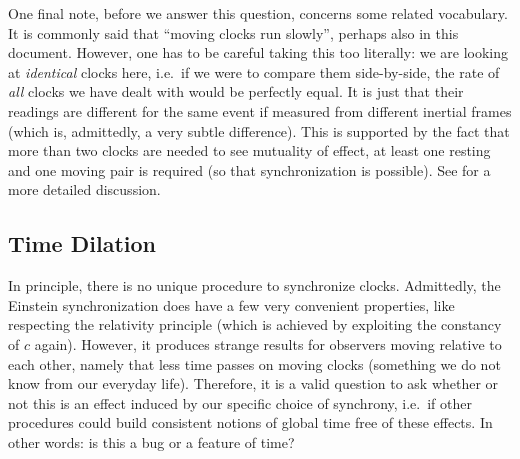 \documentclass[../relativity_main.tex]{subfiles}
\begin{document}
One final note, before we answer this question, concerns some related vocabulary. It is commonly said that \enquote{moving clocks run slowly}, perhaps also in this document. However, one has to be careful taking this too literally: we are looking at \emph{identical} clocks here, i.e.~if we were to compare them side-by-side, the rate of \emph{all} clocks we have dealt with would be perfectly equal. It is just that their readings are different for the same event if measured from different inertial frames (which is, admittedly, a very subtle difference). This is supported by the fact that more than two clocks are needed to see mutuality of effect, at least one resting and one moving pair is required (so that synchronization is possible). See \cite{giulini_srt} for a more detailed discussion.









		\subsection{Time Dilation}
In principle, there is no unique procedure to synchronize clocks. Admittedly, the Einstein synchronization does have a few very convenient properties, like respecting the relativity principle (which is achieved by exploiting the constancy of $c$ again). However, it produces strange results for observers moving relative to each other, namely that less time passes on moving clocks (something we do not know from our everyday life). Therefore, it is a valid question to ask whether or not this is an effect induced by our specific choice of synchrony, i.e.~if other procedures could build consistent notions of global time free of these effects. In other words: is this a bug or a feature of time?
\end{document}
